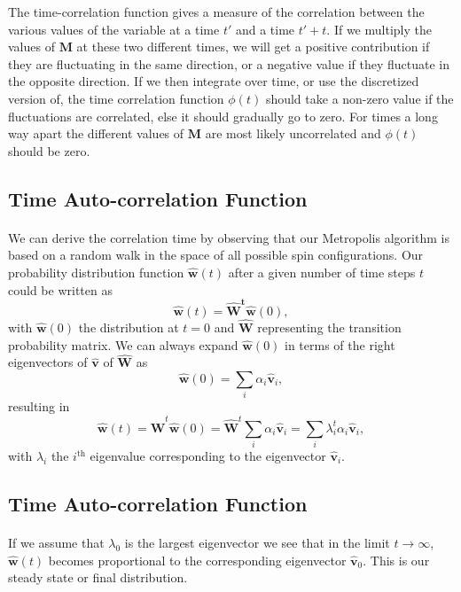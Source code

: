 \documentclass[%
oneside,                 %
final,                   %
10pt]{article}
\begin{document}
The time-correlation function gives a measure of the correlation between the various values of the variable 
at a time $t'$ and a time $t'+t$. If we multiply the values of $\mathbf{M}$ at these two different times,
we will get a positive contribution if they are fluctuating in the same direction, or a negative value
if they fluctuate in the opposite direction. If we then integrate over time, or use the discretized version of, the time correlation function $\phi(t)$ should take a non-zero value if the fluctuations are 
correlated, else it should gradually go to zero. For times a long way apart 
the different values of $\mathbf{M}$  are most likely 
uncorrelated and $\phi(t)$ should be zero.



\subsection*{Time Auto-correlation Function}

\paragraph{}
We can derive the correlation time by observing that our Metropolis algorithm is based on a random
walk in the space of all  possible spin configurations. 
Our probability 
distribution function $\mathbf{\hat{w}}(t)$ after a given number of time steps $t$ could be written as
\[
   \mathbf{\hat{w}}(t) = \mathbf{\hat{W}^t\hat{w}}(0),
\]
with $\mathbf{\hat{w}}(0)$ the distribution at $t=0$ and $\mathbf{\hat{W}}$ representing the 
transition probability matrix. 
We can always expand $\mathbf{\hat{w}}(0)$ in terms of the right eigenvectors of 
$\mathbf{\hat{v}}$ of $\mathbf{\hat{W}}$ as 
\[
    \mathbf{\hat{w}}(0)  = \sum_i\alpha_i\mathbf{\hat{v}}_i,
\]
resulting in 
\[
   \mathbf{\hat{w}}(t) = \mathbf{\hat{W}}^t\mathbf{\hat{w}}(0)=\mathbf{\hat{W}}^t\sum_i\alpha_i\mathbf{\hat{v}}_i=
\sum_i\lambda_i^t\alpha_i\mathbf{\hat{v}}_i,
\]
with $\lambda_i$ the $i^{\mathrm{th}}$ eigenvalue corresponding to  
the eigenvector $\mathbf{\hat{v}}_i$.



\subsection*{Time Auto-correlation Function}

\paragraph{}
If we assume that $\lambda_0$ is the largest eigenvector we see that in the limit $t\rightarrow \infty$,
$\mathbf{\hat{w}}(t)$ becomes proportional to the corresponding eigenvector 
$\mathbf{\hat{v}}_0$. This is our steady state or final distribution. 
\end{document}

